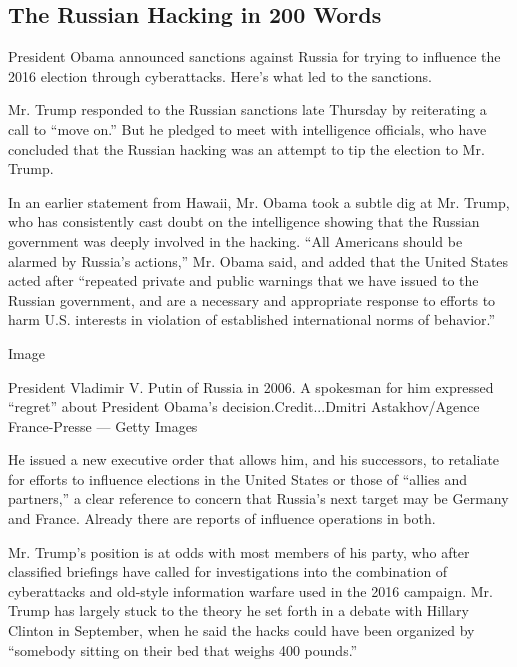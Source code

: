 \hypertarget{the-russian-hacking-in-200-words}{%
\subsection{The Russian Hacking in 200
Words}\label{the-russian-hacking-in-200-words}}

President Obama announced sanctions against Russia for trying to
influence the 2016 election through cyberattacks. Here's what led to the
sanctions.

Mr. Trump responded to the Russian sanctions late Thursday by
reiterating a call to ``move on.'' But he pledged to meet with
intelligence officials, who have concluded that the Russian hacking was
an attempt to tip the election to Mr. Trump.

In an earlier statement from Hawaii, Mr. Obama took a subtle dig at Mr.
Trump, who has consistently cast doubt on the intelligence showing that
the Russian government was deeply involved in the hacking. ``All
Americans should be alarmed by Russia's actions,'' Mr. Obama said, and
added that the United States acted after ``repeated private and public
warnings that we have issued to the Russian government, and are a
necessary and appropriate response to efforts to harm U.S. interests in
violation of established international norms of behavior.''

Image

President Vladimir V. Putin of Russia in 2006. A spokesman for him
expressed ``regret'' about President Obama's decision.Credit...Dmitri
Astakhov/Agence France-Presse --- Getty Images

He issued a new executive order that allows him, and his successors, to
retaliate for efforts to influence elections in the United States or
those of ``allies and partners,'' a clear reference to concern that
Russia's next target may be Germany and France. Already there are
reports of influence operations in both.

Mr. Trump's position is at odds with most members of his party, who
after classified briefings have called for investigations into the
combination of cyberattacks and old-style information warfare used in
the 2016 campaign. Mr. Trump has largely stuck to the theory he set
forth in a debate with Hillary Clinton in September, when he said the
hacks could have been organized by ``somebody sitting on their bed that
weighs 400 pounds.''

\href{https://www.nytimes.com/interactive/2016/12/29/us/politics/document-Report-on-Russian-Hacking.html}{}

